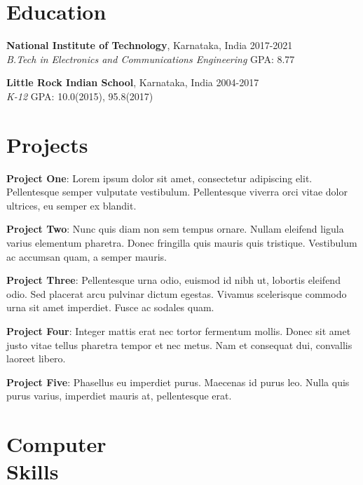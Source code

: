 \documentclass[margin]{res}
\begin{document}
\begin{resume}
  \section{Education}
    \textbf{National Institute of Technology}, Karnataka, India\hfill 
    2017-2021
    \\
    {\sl B.Tech in Electronics and Communications Engineering}\hfill 
    GPA: 8.77
    

    \textbf{Little Rock Indian School}, Karnataka, India\hfill
    2004-2017
    \\
    {\sl K-12}\hfill
    GPA: 10.0(2015), 95.8(2017)

  \section{Projects}
    \par
    \textbf{Project One}: 
    Lorem ipsum dolor sit amet, consectetur adipiscing elit. Pellentesque semper 
    vulputate vestibulum. Pellentesque viverra orci vitae dolor ultrices, eu semper 
    ex blandit. 

    \par
    \textbf{Project Two}:
    Nunc quis diam non sem tempus ornare. Nullam eleifend ligula varius 
    elementum pharetra. Donec fringilla quis mauris quis tristique. Vestibulum ac 
    accumsan quam, a semper mauris. 
    \par
    \textbf{Project Three}: 
    Pellentesque urna odio, euismod id nibh ut,  lobortis eleifend odio. Sed 
    placerat arcu pulvinar dictum egestas. Vivamus  scelerisque commodo urna sit 
    amet imperdiet. Fusce ac sodales quam.

    \par
    \textbf{Project Four}: 
    Integer mattis erat nec tortor fermentum mollis. Donec sit amet justo vitae 
    tellus pharetra tempor et nec metus. Nam et consequat dui, convallis laoreet 
    libero. 

    \par
    \textbf{Project Five}: 
    Phasellus eu imperdiet purus. Maecenas id purus leo. Nulla quis purus varius, 
    imperdiet mauris at, pellentesque erat. 

  \section{Computer\\Skills}


\end{resume}
\end{document}
